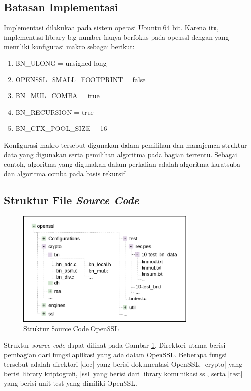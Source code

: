   \subsection{Batasan Implementasi}
    Implementasi dilakukan pada sistem operasi Ubuntu 64 bit. Karena itu, implementasi library big number hanya berfokus pada openssl dengan yang memiliki konfigurasi makro sebagai berikut:

    \begin{enumerate}[label=\roman*.]
      \item BN\_ULONG = unsigned long
      \item OPENSSL\_SMALL\_FOOTPRINT = false
      \item BN\_MUL\_COMBA = true
      \item BN\_RECURSION = true
      \item BN\_CTX\_POOL\_SIZE = 16
    \end{enumerate}
    Konfigurasi makro tersebut digunakan dalam pemilihan dan manajemen struktur data yang digunakan serta pemilihan algoritma pada bagian tertentu. Sebagai contoh, algoritma yang digunakan dalam perkalian adalah algoritma karatsuba dan algoritma comba pada basis rekursif.


  \subsection{Struktur File \textit{Source Code}}

    \begin{figure}[h]
      \centering
      \includegraphics[width=0.8\textwidth]{resources/img/ch-4/file-tree.png}
      \caption{Struktur Source Code OpenSSL}
      \label{fig:ossl_file_structure}
    \end{figure}

    Struktur \textit{source code} dapat dilihat pada Gambar \ref{fig:ossl_file_structure}. Direktori utama berisi pembagian dari fungsi aplikasi yang ada dalam OpenSSL. Beberapa fungsi tersebut adalah direktori |doc| yang berisi dokumentasi OpenSSL, |crypto| yang berisi library kriptografi, |ssl| yang berisi dari library komunikasi ssl, serta |test| yang berisi unit test yang dimiliki OpenSSL.

